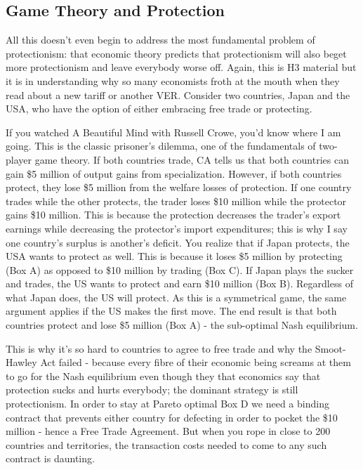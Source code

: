 \subsection{Game Theory and Protection}
All this doesn't even begin to address the most fundamental problem of protectionism: that economic theory predicts that protectionism will also beget more protectionism and leave everybody worse off. Again, this is H3 material but it is in understanding why so many economists froth at the mouth when they read about a new tariff or another VER. Consider two countries, Japan and the USA, who have the option of either embracing free trade or protecting.

If you watched A Beautiful Mind with Russell Crowe, you'd know where I am going. This is the classic prisoner's dilemma, one of the fundamentals of two-player game theory. If both countries trade, CA tells us that both countries can gain \$5 million of output gains from specialization. However, if both countries protect, they lose \$5 million from the welfare losses of protection. If one country trades while the other protects, the trader loses \$10 million while the protector gains \$10 million. This is because the protection decreases the trader's export earnings while decreasing the protector's import expenditures; this is why I say one country's surplus is another's deficit. You realize that if Japan protects, the USA wants to protect as well. This is because it loses \$5 million by protecting (Box A) as opposed to \$10 million by trading (Box C). If Japan plays the sucker and trades, the US wants to protect and earn \$10 million (Box B). Regardless of what Japan does, the US will protect. As this is a symmetrical game, the same argument applies if the US makes the first move. The end result is that both countries protect and lose \$5 million (Box A) - the sub-optimal Nash equilibrium. 

This is why it's so hard to countries to agree to free trade and why the Smoot-Hawley Act failed - because every fibre of their economic being screams at them to go for the Nash equilibrium even though they that economics say that protection sucks and hurts everybody; the dominant strategy is still protectionism. In order to stay at Pareto optimal Box D we need a binding contract that prevents either country for defecting in order to pocket the \$10 million - hence a Free Trade Agreement. But when you rope in close to 200 countries and territories, the transaction costs needed to come to any such contract is daunting.
